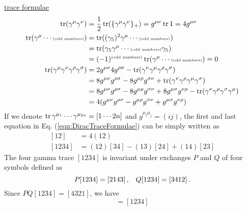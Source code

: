 \noindent
\underline{trace formulae}
\begin{equation}
\begin{split}
\operatorname{tr}( \gamma^\mu \gamma^\nu ) 
&=
\frac{1}{2} \operatorname{tr}( \{ \gamma^\mu \gamma^\nu \}_+ ) 
=
g^{\mu \nu} \operatorname{tr} 1
= 4 g^{\mu \nu} 
\\
\operatorname{tr}( \gamma^\mu \cdots \mbox{\tiny (odd numbers)}) 
&=
\operatorname{tr}((\gamma_5)^2 \gamma^\mu \cdots \mbox{\tiny (odd numbers)}) 
\\
&=
\operatorname{tr}(\gamma_5 \gamma^\mu \cdots \mbox{\tiny (odd numbers)} \gamma_5) 
\\
&=
(-1)^{\mbox{\tiny (odd numbers)}}\operatorname{tr}(\gamma^\mu \cdots \mbox{\tiny (odd numbers)}) 
= 0
\\
\operatorname{tr}( \gamma^\mu \gamma^\nu \gamma^\rho \gamma^\sigma ) 
&=
2g^{\mu \nu} 4g^{\rho \sigma} - \operatorname{tr}( \gamma^\nu \gamma^\mu \gamma^\rho \gamma^\sigma ) 
\\
&=
8g^{\mu \nu} g^{\rho \sigma} - 8g^{\mu \rho}g^{\sigma \nu}
+ \operatorname{tr}( \gamma^\nu \gamma^\rho \gamma^\mu \gamma^\sigma ) 
\\
&=
8g^{\mu \nu} g^{\rho \sigma} - 8g^{\mu \rho}g^{\sigma \nu}
+ 8g^{\mu \sigma}g^{\nu \rho}
-\operatorname{tr}( \gamma^\nu \gamma^\rho \gamma^\sigma \gamma^\mu ) 
\\
&=
4 (
g^{\mu \nu} g^{\rho \sigma} - g^{\mu \rho}g^{\sigma \nu}
+ g^{\mu \sigma}g^{\nu \rho}
)
\end{split}
\label{eqn:DiracTraceFormulae}
\end{equation}
If we denote $\operatorname{tr}{\gamma^{\mu_1} \cdots \gamma^{\mu_{2n}} } = \left[ 1 \cdots 2n \right]$ and
$g^{\mu_i \mu_j } = (ij)$,
the first and last equation in Eq. (\ref{eqn:DiracTraceFormulae}) can be simply written as
\begin{equation}
\begin{split}
[12] &= 4(12)
\\
[1234]
&=
(12)[34] - (13)[24] + (14)[23]
\end{split}
\label{eqn:DiracTraceSimpleNotation}
\end{equation}
The four gamma trace $[1234]$ is invariant under exchanges 
$P$ and $Q$ of four symbols defined as
\begin{equation}
P[1234] = [2143]\,,
\hspace{3mm}
Q[1234] = [3412]\,.
\end{equation}
Since $PQ[1234] = [4321]$, we have
\begin{equation}
[4321] = [1234]
\label{eqn:DiracTrace4gammaDecOrder}
\end{equation}
